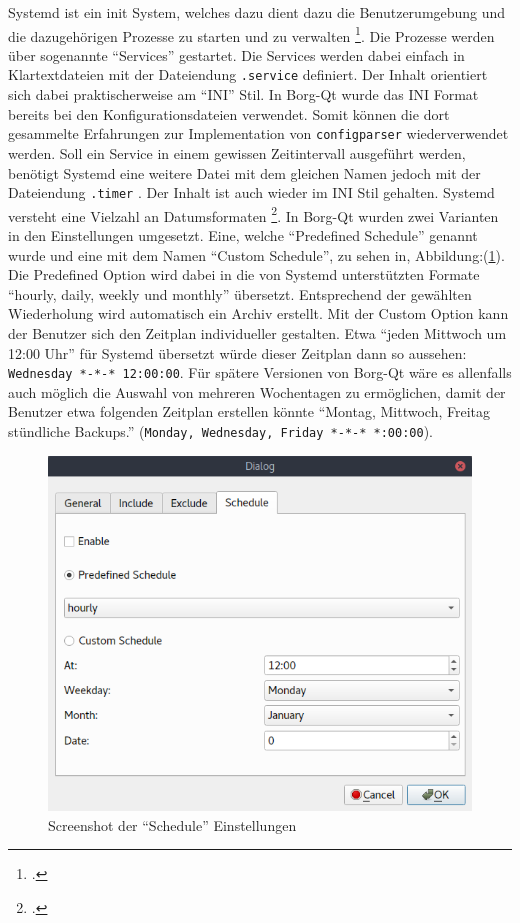 Systemd ist ein init System, welches dazu dient dazu die Benutzerumgebung und
die dazugehörigen Prozesse zu starten und zu verwalten \footcite{systemd}. Die
Prozesse werden über sogenannte "`Services"' gestartet. Die Services werden dabei
einfach in Klartextdateien mit der Dateiendung \texttt{.service} definiert. Der Inhalt
orientiert sich dabei praktischerweise am "`INI"' Stil. In Borg-Qt wurde das INI
Format bereits bei den Konfigurationsdateien verwendet. Somit können die dort
gesammelte Erfahrungen zur Implementation von \texttt{configparser} wiederverwendet
werden. Soll ein Service in einem gewissen Zeitintervall ausgeführt werden,
benötigt Systemd eine weitere Datei mit dem gleichen Namen jedoch mit der
Dateiendung \texttt{.timer} . Der Inhalt ist auch wieder im INI Stil gehalten. Systemd
versteht eine Vielzahl an Datumsformaten \footcite{systemddate}. In Borg-Qt
wurden zwei Varianten in den Einstellungen umgesetzt. Eine, welche "`Predefined
Schedule"' genannt wurde und eine mit dem Namen "`Custom Schedule"', zu sehen in,
Abbildung:(\ref{fig:orga59a60c}). Die Predefined Option wird dabei in die von Systemd
unterstützten Formate "`hourly, daily, weekly und monthly"' übersetzt.
Entsprechend der gewählten Wiederholung wird automatisch ein Archiv erstellt.
Mit der Custom Option kann der Benutzer sich den Zeitplan individueller
gestalten. Etwa "`jeden Mittwoch um 12:00 Uhr"' für Systemd übersetzt würde
dieser Zeitplan dann so aussehen: \texttt{Wednesday *-*-* 12:00:00}. Für spätere
Versionen von Borg-Qt wäre es allenfalls auch möglich die Auswahl von mehreren
Wochentagen zu ermöglichen, damit der Benutzer etwa folgenden Zeitplan erstellen
könnte "`Montag, Mittwoch, Freitag stündliche Backups."' (\texttt{Monday, Wednesday,
Friday *-*-* *:00:00}).

\begin{figure}[H]
\centering
\includegraphics[width=.9\linewidth]{pictures/borgqt_settings_schedule.png}
\caption{\label{fig:orga59a60c}
Screenshot der "`Schedule"' Einstellungen}
\end{figure}

